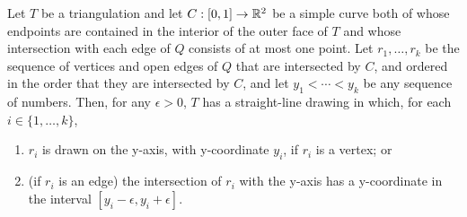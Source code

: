 \documentclass{patmorin}
\begin{document}
\begin{thm}
   Let $T$ be a triangulation and let $C:[0,1]\to\mathbb{R}^2$ be a simple curve
   both of whose endpoints are contained in the interior of the outer face
   of $T$ and whose intersection with each edge of $Q$ consists
   of at most one point. Let $r_1,\ldots,r_k$ be the sequence of
   vertices and open edges of $Q$ that are intersected by $C$, and ordered in
   the order that they are intersected by $C$, and let $y_1<\cdots<y_k$
   be any sequence of numbers.  Then, for any $\epsilon>0$, $T$ has a
   straight-line drawing in which,
   for each $i\in\{1,\ldots,k\}$, 
   \begin{enumerate}
       \item $r_i$ is drawn on the y-axis, with y-coordinate $y_i$,
         if $r_i$ is a vertex; or
       \item (if $r_i$ is an edge) the intersection of $r_i$ with the
         y-axis has a y-coordinate in the interval
         $[y_i-\epsilon,y_i+\epsilon]$.
   \end{enumerate}
\end{thm}
\end{document}
